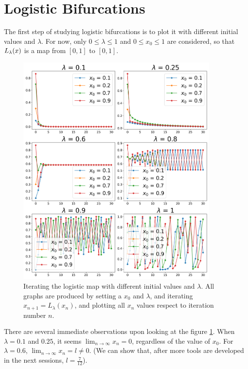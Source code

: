 \section{Logistic Bifurcations}

The first step of studying logistic bifurcations is to plot it with different initial values and $\lambda$. 
For now, only $0 \leq \lambda \leq 1$ and $0 \leq x_0 \leq 1$ are considered, so that $L_{\lambda}(x)$ is a map from $[0,1]$ to $[0,1]$. 

\begin{figure}[htbp]
	\centering
	\includegraphics[width=0.9\textwidth]{./figures/various_iterating_logistic_map.png}
	\caption{Iterating the logistic map with different initial values and $\lambda$. All graphs are produced by setting a $x_0$ and $\lambda$, and iterating $x_{n+1} = L_{\lambda}(x_n)$, and plotting all $x_n$ values respect to iteration number $n$.}
	\label{fig:various_iter_logistic}
\end{figure}

There are several immediate observations upon looking at the figure \ref{fig:various_iter_logistic}.
When $\lambda = 0.1$ and $0.25$, it seems $\lim_{n \rightarrow \infty} x_n = 0$, regardless of the value of $x_0$.
For $\lambda = 0.6$, $\lim_{n \rightarrow \infty} x_n = l \neq 0$. 
(We can show that, after more tools are developed in the next sessions, $l = \frac{7}{12}$). 

